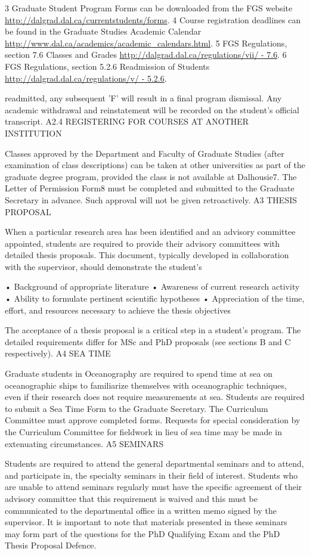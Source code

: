 \documentclass{article}
\newcommand\elink[1]{\url{#1}}
\begin{document}
3 Graduate Student Program Forms can be downloaded from the FGS website \elink{http://dalgrad.dal.ca/currentstudents/forms}.
4 Course registration deadlines can be found in the Graduate Studies Academic Calendar \elink{http://www.dal.ca/academics/academic_calendars.html}.
5 FGS Regulations, section 7.6 Classes and Grades \elink{http://dalgrad.dal.ca/regulations/vii/ - 7.6}.
6 FGS Regulations, section 5.2.6 Readmission of Students \elink{http://dalgrad.dal.ca/regulations/v/ - 5.2.6}.
 

readmitted, any subsequent 'F' will result in a final program dismissal. Any academic withdrawal and reinstatement will be recorded on the student's official transcript.
A2.4	REGISTERING FOR COURSES AT ANOTHER INSTITUTION

Classes approved by the Department and Faculty of Graduate Studies (after examination of class descriptions) can be taken at other universities as part of the graduate degree program, provided the class is not available at Dalhousie7.
The Letter of Permission Form8 must be completed and submitted to the Graduate Secretary in advance. Such approval will not be given retroactively.
A3	THESIS PROPOSAL

When a particular research area has been identified and an advisory committee appointed, students are required to provide their advisory committees with detailed thesis proposals. This document, typically developed in collaboration with the supervisor, should demonstrate the student's

•	Background of appropriate literature
•	Awareness of current research activity
•	Ability to formulate pertinent scientific hypotheses
•	Appreciation of the time, effort, and resources necessary to achieve the thesis objectives

The acceptance of a thesis proposal is a critical step in a student's program. The detailed requirements differ for MSc and PhD proposals (see sections B and C respectively).
A4	SEA TIME

Graduate students in Oceanography are required to spend time at sea on oceanographic ships to familiarize themselves with oceanographic techniques, even if their research does not require measurements at sea. Students are required to submit a Sea Time Form to the Graduate Secretary. The Curriculum Committee must approve completed forms. Requests for special consideration by the Curriculum Committee for fieldwork in lieu of sea time may be made in extenuating circumstances.
A5	SEMINARS

Students are required to attend the general departmental seminars and to attend, and participate in, the specialty seminars in their field of interest. Students who are unable to attend seminars regularly must have the specific agreement of their advisory committee that this requirement is waived and this must be communicated to the departmental office in a written memo signed by the supervisor. It is important to note that materials presented in these seminars may form part of the questions for the PhD Qualifying Exam and the PhD Thesis Proposal Defence.
\end{document}
